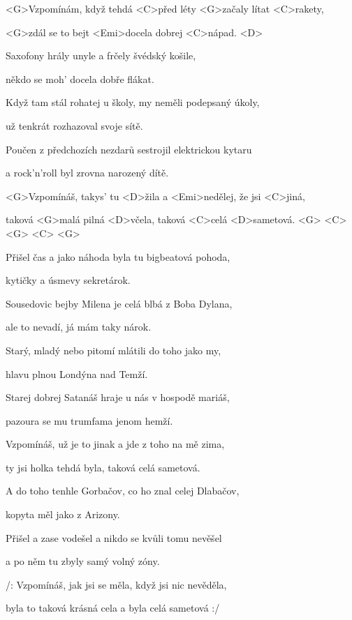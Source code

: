 

\zs
<G>Vzpomínám, když tehdá <C>před léty
<G>začaly lítat <C>rakety,

<G>zdál se to bejt <Emi>docela dobrej <C>nápad. <D>

Saxofony hrály unyle a frčely švédský košile,

někdo se moh' docela dobře flákat.
\ks

\zs
Když tam stál rohatej u školy, my neměli podepsaný úkoly,

už tenkrát rozhazoval svoje sítě.

Poučen z předchozích nezdarů sestrojil elektrickou kytaru

a rock'n'roll byl zrovna narozený dítě.
\ks

\zr
<G>Vzpomínáš, takys' tu <D>žila a <Emi>nedělej, že jsi <C>jiná,

taková <G>malá pilná <D>včela, taková <C>celá <D>sametová. <G> <C> <G> <C> <G>
\kr

\zs
Přišel čas a jako náhoda byla tu bigbeatová pohoda,

kytičky a úsmevy sekretárok.

Sousedovic bejby Milena je celá blbá z Boba Dylana,

ale to nevadí, já mám taky nárok.
\ks

\zs
Starý, mladý nebo pitomí mlátili do toho jako my,

hlavu plnou Londýna nad Temží.

Starej dobrej Satanáš hraje u nás v hospodě mariáš,

pazoura se mu trumfama jenom hemží.
\ks

\zr
Vzpomínáš, už je to jinak a jde z toho na mě zima,

ty jsi holka tehdá byla, taková celá sametová.
\kr

\zs
A do toho tenhle Gorbačov, co ho znal celej Dlabačov,

kopyta měl jako z Arizony.

Přišel a zase vodešel a nikdo se kvůli tomu nevěšel

a po něm tu zbyly samý volný zóny.
\ks

\zr
/: Vzpomínáš, jak jsi se měla,
když jsi nic nevěděla,

byla to taková krásná cela a byla celá sametová :/
\kr

\kp
